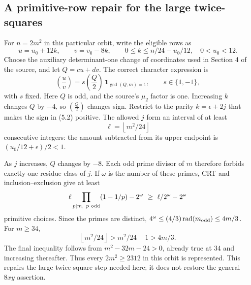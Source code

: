 \documentclass[10pt]{article}
\begin{document}
\subsection*{A primitive-row repair for the large twice-squares}
For \(n=2m^2\) in this particular orbit, write the eligible rows as \[u=u_0+12k,\qquad v=v_0-8k,\qquad
 0\leq k\leq n/24-u_0/12,\quad 0<u_0<12.\] Choose the auxiliary determinant-one change of coordinates used in Section 4 of the source, and let \(Q=cu+dv\). The correct character expression is \[\left(\frac{u}{v}\right)=s\left(\frac{Q}{2}\right)\,\mathbf1_{\gcd(Q,m)=1},
 \qquad s\in\{1,-1\},
 \tag{5.2}\] with \(s\) fixed. Here \(Q\) is odd, and the source’s \(\mu_2\) factor is one. Increasing \(k\) changes \(Q\) by \(-4\), so \(\left(\frac{Q}{2}\right)\) changes sign. Restrict to the parity \(k=\epsilon+2j\) that makes the sign in (5.2) positive. The allowed \(j\) form an interval of at least \[\ell=\left\lfloor m^2/24\right\rfloor\] consecutive integers: the amount subtracted from its upper endpoint is \((u_0/12+\epsilon)/2<1\).\par
As \(j\) increases, \(Q\) changes by \(-8\). Each odd prime divisor of \(m\) therefore forbids exactly one residue class of \(j\). If \(\omega\) is the number of these primes, CRT and inclusion–exclusion give at least \[\ell\prod_{p\mid m,\ p\ {\rm odd}}(1-1/p)-2^\omega
 \ \geq\ \ell/2^\omega-2^\omega\] primitive choices. Since the primes are distinct, \(4^\omega\leq(4/3)\operatorname{rad}(m_{\rm odd})\leq4m/3\). For \(m\geq34\), \[\left\lfloor m^2/24\right\rfloor
       >m^2/24-1>4m/3.\] The final inequality follows from \(m^2-32m-24>0\), already true at \(34\) and increasing thereafter. Thus every \(2m^2\geq2312\) in this orbit is represented. This repairs the large twice-square step needed here; it does not restore the general \(8xy\) assertion.\par
\end{document}
